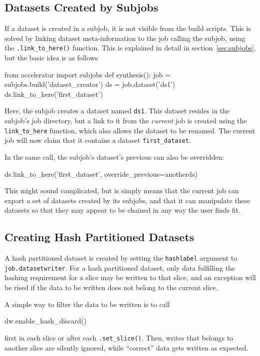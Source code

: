 \subsection{Datasets Created by Subjobs}
If a dataset is created in a subjob, it is not visible from the build
scripts.  This is solved by linking dataset meta-information to the
job calling the subjob, using the \texttt{.link\_to\_here()} function.
This is explained in detail in section~\ref{sec:subjobs}, but the
basic idea is as follows
\begin{python}
from accelerator import subjobs
def synthesis():
    job = subjobs.build('dataset_creator')
    ds = job.dataset('ds1')
    ds.link_to_here('first_dataset')
\end{python}
Here, the subjob creates a dataset named \texttt{ds1}.  This dataset
resides in the subjob's job directory, but a link to it from
the \textsl{current} job is created using the \texttt{link\_to\_here}
function, which also allows the dataset to be renamed.  The current
job will now claim that it contains a dataset \texttt{first\_dataset}.

In the same call, the subjob's dataset's previous can also be
overridden:
\begin{python}
    ds.link_to_here('first_dataset', override_previous=anotherds)
\end{python}
This might sound complicated, but is simply means that the current job
can export a set of datasets created by its subjobs, and that it can
manipulate these datasets so that they may appear to be chained in any
way the user finds fit.



\subsection{Creating Hash Partitioned Datasets}
A hash partitioned dataset is created by setting
the \texttt{hashlabel} argument to \texttt{job.datasetwriter}.  For a
hash partitioned dataset, only data fulfilling the hashing requirement
for a slice may be written to that slice, and an exception will be
rised if the data to be written does not belong to the current slice.

A simple way to filter the data to be written is to call
\begin{python}
    dw.enable_hash_discard()
\end{python}
first in each slice or after each \texttt{.set\_slice()}.  Then,
writes that belongs to another slice are silently ignored, while
``correct'' data gets written as expected.

